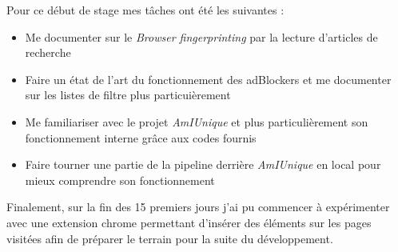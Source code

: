 \documentclass[oneside,a4paper,12pt]{article}
\begin{document}
Pour ce début de stage mes tâches ont été les suivantes :

\begin{itemize}
	\item Me documenter sur le \textit{Browser fingerprinting} par la lecture d'articles de recherche
	\item Faire un état de l'art du fonctionnement des adBlockers et me documenter sur les listes de filtre plus particuièrement
	\item Me familiariser avec le projet \textit{AmIUnique} et plus particulièrement son fonctionnement interne grâce aux codes fournis
	\item Faire tourner une partie de la pipeline derrière \textit{AmIUnique} en local pour mieux comprendre son fonctionnement
\end{itemize}

Finalement, sur la fin des 15 premiers jours j'ai pu commencer à expérimenter avec une extension chrome permettant d'insérer des éléments sur les pages visitées afin de préparer le terrain pour la suite du développement.
\end{document}
